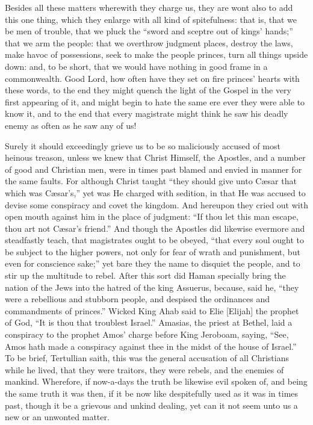 Besides all these matters wherewith they charge us, they are wont
also to add this one thing, which they enlarge with all kind of spitefulness:
that is, that we be men of trouble, that we pluck the “sword and
sceptre out of kings’ hands;” that we arm the people: that
we overthrow judgment places, destroy the laws, make havoc of possessions,
seek to make the people princes, turn all things upside down: and, to
be short, that we would have nothing in good frame in a commonwealth.
Good Lord, how often have they set on fire princes’ hearts with
these words, to the end they might quench the light of the Gospel in
the very first appearing of it, and might begin to hate the same ere
ever they were able to know it, and to the end that every magistrate
might think he saw his deadly enemy as often as he saw any of us!

Surely it should exceedingly grieve us to be so maliciously accused
of most heinous treason, unless we
knew that Christ Himself, the Apostles, and a number of good and Christian
men, were in times past blamed and envied in manner for the same faults.
For although Christ taught “they should give unto Cæsar
that which was Cæsar’s,” yet was He charged with sedition,
in that He was accused to devise some conspiracy and covet the kingdom.
And hereupon they cried out with open mouth against him in the place
of judgment: “If thou let this man escape, thou art not Cæsar’s
friend.” And though the Apostles did likewise evermore and
steadfastly teach, that magistrates ought to be obeyed, “that
every soul ought to be subject to the higher powers, not only for fear
of wrath and punishment, but even for conscience sake;” yet bare
they the name to disquiet the people, and to stir up the multitude to
rebel. After this sort did Haman specially bring the nation of
the Jews into the hatred of the king Assuerus, because, said he, “they
were a rebellious and stubborn people, and despised the ordinances and
commandments of princes.” Wicked King Ahab said to Elie
[Elijah] the prophet of God, “It is thou that troublest Israel.”
Amasias, the priest at Bethel, laid a conspiracy to the prophet Amos’
charge before King Jeroboam, saying, “See, Amos hath made a conspiracy
against thee in the midst of the house of Israel.”
To be brief, Tertullian saith, this was the general accusation of all
Christians while he lived, that they were traitors, they were rebels,
and the enemies of mankind. Wherefore, if now-a-days the truth
be likewise evil spoken of, and being the same truth it was then, if
it be now like despitefully used as it was in times past, though it
be a grievous and unkind dealing, yet can it not seem unto us a new
or an unwonted matter.

